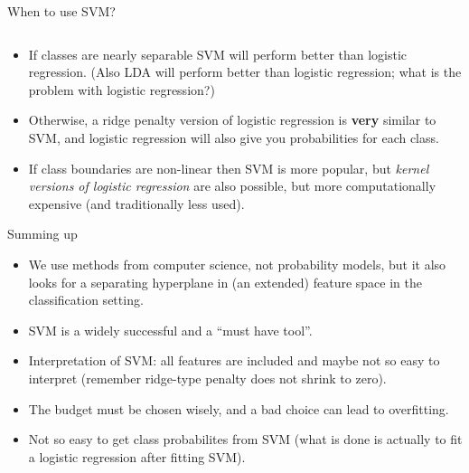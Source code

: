 \documentclass[10pt,ignorenonframetext,]{beamer}
\providecommand{\tightlist}{%
  \setlength{\itemsep}{0pt}\setlength{\parskip}{0pt}}
\begin{document}
\begin{frame}

\begin{block}{When to use SVM?}

\(~\)

\begin{itemize}
\tightlist
\item
  If classes are nearly separable SVM will perform better than logistic
  regression. (Also LDA will perform better than logistic regression;
  what is the problem with logistic regression?)
\end{itemize}

\vspace{2mm}

\begin{itemize}
\tightlist
\item
  Otherwise, a ridge penalty version of logistic regression is
  \textbf{very} similar to SVM, and logistic regression will also give
  you probabilities for each class.
\end{itemize}

\vspace{2mm}

\begin{itemize}
\tightlist
\item
  If class boundaries are non-linear then SVM is more popular, but
  \emph{kernel versions of logistic regression} are also possible, but
  more computationally expensive (and traditionally less used).
\end{itemize}

\end{block}

\end{frame}

\begin{frame}{Summing up}
\protect\hypertarget{summing-up}{}

\begin{itemize}
\item
  We use methods from computer science, not probability models, but it
  also looks for a separating hyperplane in (an extended) feature space
  in the classification setting.
\item
  SVM is a widely successful and a ``must have tool''.
\item
  Interpretation of SVM: all features are included and maybe not so easy
  to interpret (remember ridge-type penalty does not shrink to zero).
\item
  The budget must be chosen wisely, and a bad choice can lead to
  overfitting.
\item
  Not so easy to get class probabilites from SVM (what is done is
  actually to fit a logistic regression after fitting SVM).
\end{itemize}

\end{frame}
\end{document}
